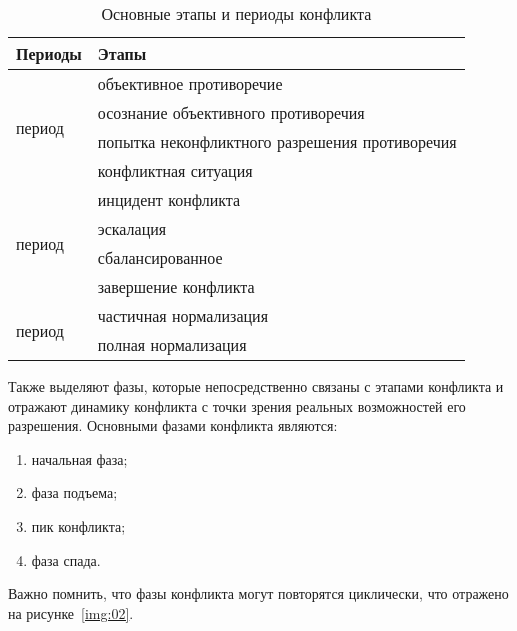 \noindent
{
\captionsetup{format=hang,justification=raggedright,
              singlelinecheck=off,width=11cm}
\begin{longtable}[c]{|p{4.2cm}|p{6cm}|}
\caption{Основные этапы и периоды конфликта\label{tab:01}}\\
    \hline
    \bfseries Периоды & \bfseries Этапы \\
    \hline
    \multirow{4}{*}{\parbox[c]{4cm}{\vspace{1.5cm} период}}
          & объективное противоречие \\ \cline{2-2}
          & осознание объективного противоречия \\ \cline{2-2}
          & попытка неконфликтного разрешения противоречия \\ \cline{2-2}
          & конфликтная ситуация \\
    \hline
    \multirow{4}{*}{\parbox[c]{4cm}{\vspace{1cm} период}}
          & инцидент конфликта \\ \cline{2-2}
          & эскалация \\ \cline{2-2}
          & сбалансированное \\ \cline{2-2}
          & завершение конфликта \\
    \hline
    \multirow{2}{*}{\parbox[c]{4cm}{\vspace{0.9cm} период}}
          & частичная нормализация \\ \cline{2-2}
          & полная нормализация \\ \cline{1-2}
\end{longtable}
}

Также выделяют фазы, которые непосредственно связаны с этапами конфликта и
отражают динамику конфликта с точки зрения реальных возможностей его
разрешения. Основными фазами конфликта являются:
\begin{enumerate}
    \item начальная фаза;
    \item фаза подъема;
    \item пик конфликта;
    \item фаза спада.
\end{enumerate}

Важно помнить, что фазы конфликта могут повторятся циклически, что отражено
на рисунке~\ref{img:02}.
~\\

